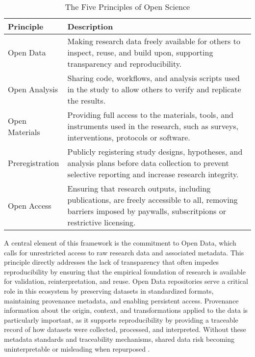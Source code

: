 \documentclass{article}
\begin{document}
\begin{table}[ht]
    \centering
    \caption{The Five Principles of Open Science \cite{van_dijk_open_2021}}
    \label{tab:open_science_principles}
    \begin{tabular}{|l|p{11cm}|}
        \hline
        \textbf{Principle} & \textbf{Description}                                                                                                                                                 \\
        \hline
        Open Data          & Making research data freely available for others to inspect, reuse, and build upon, supporting transparency and reproducibility.                                     \\
        \hline
        Open Analysis      & Sharing code, workflows, and analysis scripts used in the study to allow others to verify and replicate the results.                                                 \\
        \hline
        Open Materials     & Providing full access to the materials, tools, and instruments used in the research, such as surveys, interventions, protocols or software.                          \\
        \hline
        Preregistration    & Publicly registering study designs, hypotheses, and analysis plans before data collection to prevent selective reporting and increase research integrity.            \\
        \hline
        Open Access        & Ensuring that research outputs, including publications, are freely accessible to all, removing barriers imposed by paywalls, subscritpions or restrictive licensing. \\
        \hline
    \end{tabular}
\end{table}

A central element of this framework is the commitment to Open Data, which calls for unrestricted access to raw research data and associated metadata. This principle directly addresses the lack of transparency that often impedes reproducibility by ensuring that the empirical foundation of research is available for validation, reinterpretation, and reuse. Open Data repositories serve a critical role in this ecosystem by preserving datasets in standardized formats, maintaining provenance metadata, and enabling persistent access. Provenance information about the origin, context, and transformations applied to the data is particularly important, as it supports reproducibility by providing a traceable record of how datasets were collected, processed, and interpreted. Without these metadata standards and traceability mechanisms, shared data risk becoming uninterpretable or misleading when repurposed \cite{learn_2017, burgelman_open_2019}.
\end{document}
